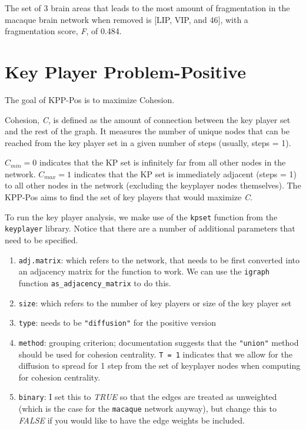 \documentclass[
]{book}
\providecommand{\tightlist}{%
  \setlength{\itemsep}{0pt}\setlength{\parskip}{0pt}}
\begin{document}
The set of 3 brain areas that leads to the most amount of fragmentation in the macaque brain network when removed is {[}LIP, VIP, and 46{]}, with a fragmentation score, \emph{F}, of 0.484.

\section{Key Player Problem-Positive}\label{key-player-problem-positive}

The goal of KPP-Pos is to maximize Cohesion.

Cohesion, \emph{C}, is defined as the amount of connection between the key player set and the rest of the graph. It measures the number of unique nodes that can be reached from the key player set in a given number of steps (usually, steps = 1).

\(C_{min} = 0\) indicates that the KP set is infinitely far from all other nodes in the network. \(C_{max} = 1\) indicates that the KP set is immediately adjacent (steps = 1) to all other nodes in the network (excluding the keyplayer nodes themselves). The KPP-Pos aims to find the set of key players that would maximize \emph{C}.

To run the key player analysis, we make use of the \texttt{kpset} function from the \texttt{keyplayer} library. Notice that there are a number of additional parameters that need to be specified.

\begin{enumerate}
\def\labelenumi{(\roman{enumi})}
\tightlist
\item
  \texttt{adj.matrix}: which refers to the network, that needs to be first converted into an adjacency matrix for the function to work. We can use the \texttt{igraph} function \texttt{as\_adjacency\_matrix} to do this.
\item
  \texttt{size}: which refers to the number of key players or size of the key player set
\item
  \texttt{type}: needs to be \texttt{"diffusion"} for the positive version
\item
  \texttt{method}: grouping criterion; documentation suggests that the \texttt{"union"} method should be used for cohesion centrality. \texttt{T\ =\ 1} indicates that we allow for the diffusion to spread for 1 step from the set of keyplayer nodes when computing for cohesion centrality.
\item
  \texttt{binary}: I set this to \emph{TRUE} so that the edges are treated as unweighted (which is the case for the \texttt{macaque} network anyway), but change this to \emph{FALSE} if you would like to have the edge weights be included.
\end{enumerate}
\end{document}
